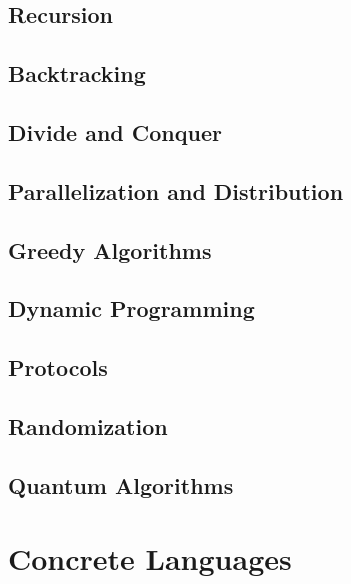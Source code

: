 \documentclass{book}
\begin{document}
\chapter{Recursion}
%
\chapter{Backtracking}


\chapter{Divide and Conquer}
 
\chapter{Parallelization and Distribution}


\chapter{Greedy Algorithms}

\chapter{Dynamic Programming}

\chapter{Protocols}

\chapter{Randomization}

\chapter{Quantum Algorithms}

\part{Concrete Languages}
\end{document}
